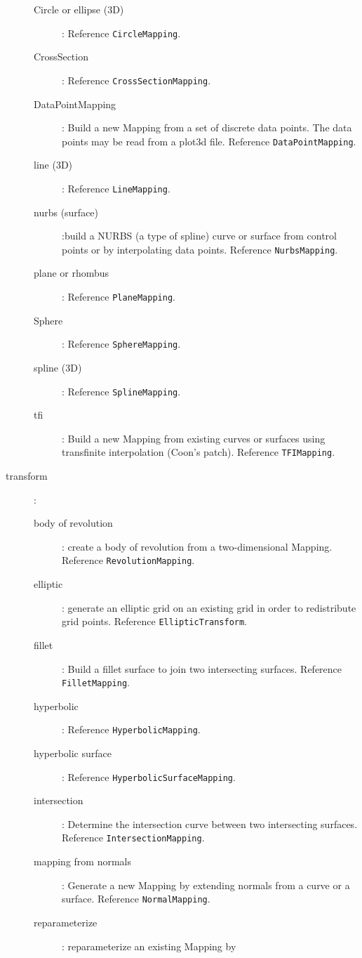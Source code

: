 \documentclass[xcolor=rgb,svgnames,dvipsnames]{article}
\begin{document}
\begin{description}
\begin{description}
    \item[Circle or ellipse (3D)] :  Reference {\tt CircleMapping}.
    \item[CrossSection] : Reference {\tt CrossSectionMapping}.
    \item[DataPointMapping] : Build a new Mapping from a set of discrete data points.
        The data points may be read from a plot3d file. Reference {\tt DataPointMapping}.
    \item[line (3D)] : Reference {\tt LineMapping}.
    \item[nurbs (surface)] :build a NURBS (a type of spline) curve or surface from control points or by
      interpolating data points.  Reference {\tt NurbsMapping}.
    \item[plane or rhombus] : Reference {\tt PlaneMapping}.
    \item[Sphere] : Reference {\tt SphereMapping}.
    \item[spline (3D)] : Reference {\tt SplineMapping}.
    \item[tfi] : Build a new Mapping from existing curves or surfaces using 
          transfinite interpolation (Coon's patch). Reference {\tt TFIMapping}.
  \end{description}
  \item[transform] :
  \begin{description}
    \item[body of revolution] : create a body of revolution from a two-dimensional
       Mapping. Reference {\tt Revolution\-Mapping}. 
    \item[elliptic] : generate an elliptic grid on an existing grid in order to redistribute
        grid points. Reference {\tt Elliptic\-Transform}. 
    \item[fillet] : Build a fillet surface to join two intersecting surfaces. Reference {\tt Fillet\-Mapping}. 
    \item[hyperbolic] : Reference {\tt Hyperbolic\-Mapping}.
    \item[hyperbolic surface] :  Reference {\tt Hyperbolic\-Surface\-Mapping}.
    \item[intersection] : Determine the intersection curve between two intersecting surfaces. 
            Reference {\tt Intersection\-Mapping}.
    \item[mapping from normals] :  Generate a new Mapping by extending normals from a curve or a surface.
         Reference {\tt NormalMapping}.
    \item[reparameterize] :  reparameterize an existing Mapping by 

\end{description}
\end{description}
\end{document}
